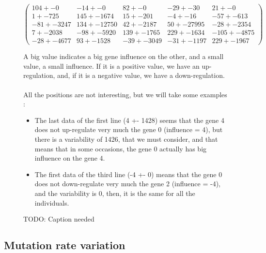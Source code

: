 \documentclass[]{report} %
\begin{document}
    \begin{figure}[H] 
            \centering
            \small
    $
            \begin{pmatrix}
                104 +- 0 & -14 +- 0 & 82 +- 0 & -29 +- 30 & 21 +- 0 \\
                1 +- 725 & 145 +- 1674 & 15 +- 201 & -4 +- 16 & -57 +- 613 \\
                -81 +- 3247 & 134 +- 12750 & 42 +- 2187 & 50 +- 27995 & -28 +- 2354 \\
                7 +- 2038 & -98 +- 5920 & 139 +- 1765 & 229 +- 1634 & -105 +- 4875 \\
                -28 +- 4677 & 93 +- 1528 & -39 +- 3049 & -31 +- 1197 & 229 +- 1967 
            \end{pmatrix}
    $
            \caption{\footnotesize TODO: Caption needed}
            \label{mat:telltaleAlt}
    A big value indicates a big gene influence on the other, and a small value, a small influence. If it is a positive value, we have an up-regulation, and, if it is a negative value, we have a down-regulation.
    \paragraph*{}
    All the positions are not interesting, but we will take some examples :
    \begin{itemize}
        \item The last data of the first line (4 +- 1428) seems that the gene 4 does not up-regulate very much the gene 0 (influence = 4), but there is a variability of 1426, that we must consider, and that means that in some occasions, the gene 0 actually has big influence on the gene 4.
        \item The first data of the third line (-4 +- 0) means that the gene 0 does not down-regulate very much the gene 2 (influence = -4), and the variability is 0, then, it is the same for all the individuals.
    \end{itemize}
    \end{figure}
    
\subsection{Mutation rate variation}
    
\end{document}
